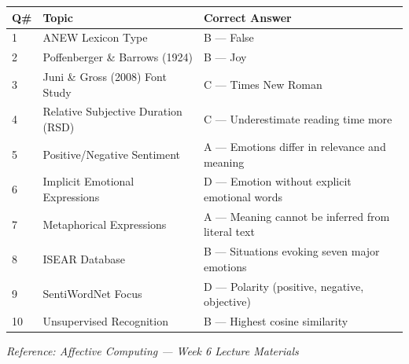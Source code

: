 \documentclass[11pt,a4paper]{article}
\newcommand{\bb}[1]{\textbf{#1}}
\begin{document}
\begin{center}
\renewcommand{\arraystretch}{1.4}
\begin{tabular}{|L{0.8cm}|L{6.2cm}|L{8.2cm}|}
\hline
\bb{Q\#} & \bb{Topic} & \bb{Correct Answer} \\
 & ANEW Lexicon Type & B --- False \\
2 & Poffenberger \& Barrows (1924) & B --- Joy \\
3 & Juni \& Gross (2008) Font Study & C --- Times New Roman \\
4 & Relative Subjective Duration (RSD) & C --- Underestimate reading time more \\
5 & Positive/Negative Sentiment & A --- Emotions differ in relevance and meaning \\
6 & Implicit Emotional Expressions & D --- Emotion without explicit emotional words \\
7 & Metaphorical Expressions & A --- Meaning cannot be inferred from literal text \\
8 & ISEAR Database & B --- Situations evoking seven major emotions \\
9 & SentiWordNet Focus & D --- Polarity (positive, negative, objective) \\
10 & Unsupervised Recognition & B --- Highest cosine similarity \\
\hline
\end{tabular}
\end{center}

\medskip
{\small\textit{Reference: Affective Computing --- Week 6 Lecture Materials}}
\end{document}
